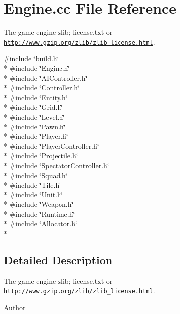 \section{Engine.\-cc File Reference}
\label{_engine_8cc}


The game engine  zlib; license.\-txt or \href{http://www.gzip.org/zlib/zlib_license.html}{\tt http\-://www.\-gzip.\-org/zlib/zlib\-\_\-license.\-html}.  


{\ttfamily \#include \char`\"{}build.\-h\char`\"{}}\\*
{\ttfamily \#include \char`\"{}Engine.\-h\char`\"{}}\\*
{\ttfamily \#include \char`\"{}A\-I\-Controller.\-h\char`\"{}}\\*
{\ttfamily \#include \char`\"{}Controller.\-h\char`\"{}}\\*
{\ttfamily \#include \char`\"{}Entity.\-h\char`\"{}}\\*
{\ttfamily \#include \char`\"{}Grid.\-h\char`\"{}}\\*
{\ttfamily \#include \char`\"{}Level.\-h\char`\"{}}\\*
{\ttfamily \#include \char`\"{}Pawn.\-h\char`\"{}}\\*
{\ttfamily \#include \char`\"{}Player.\-h\char`\"{}}\\*
{\ttfamily \#include \char`\"{}Player\-Controller.\-h\char`\"{}}\\*
{\ttfamily \#include \char`\"{}Projectile.\-h\char`\"{}}\\*
{\ttfamily \#include \char`\"{}Spectator\-Controller.\-h\char`\"{}}\\*
{\ttfamily \#include \char`\"{}Squad.\-h\char`\"{}}\\*
{\ttfamily \#include \char`\"{}Tile.\-h\char`\"{}}\\*
{\ttfamily \#include \char`\"{}Unit.\-h\char`\"{}}\\*
{\ttfamily \#include \char`\"{}Weapon.\-h\char`\"{}}\\*
{\ttfamily \#include \char`\"{}Runtime.\-h\char`\"{}}\\*
{\ttfamily \#include \char`\"{}Allocator.\-h\char`\"{}}\\*


\subsection{Detailed Description}
The game engine  zlib; license.\-txt or \href{http://www.gzip.org/zlib/zlib_license.html}{\tt http\-://www.\-gzip.\-org/zlib/zlib\-\_\-license.\-html}. \begin{DoxyAuthor}{Author}

\end{DoxyAuthor}
